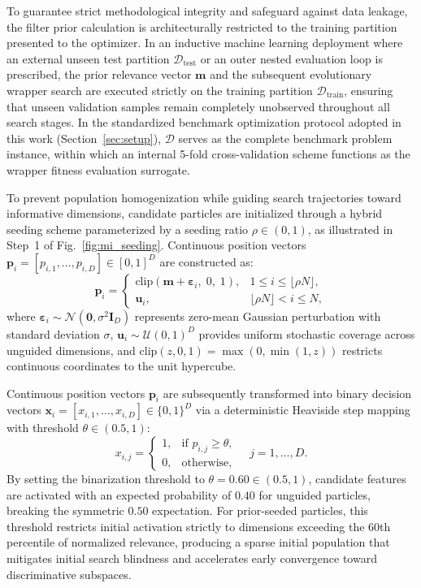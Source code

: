 To guarantee strict methodological integrity and safeguard against data leakage, the filter prior calculation is architecturally restricted to the training partition presented to the optimizer. In an inductive machine learning deployment where an external unseen test partition $\mathcal{D}_{\mathrm{test}}$ or an outer nested evaluation loop is prescribed, the prior relevance vector $\mathbf{m}$ and the subsequent evolutionary wrapper search are executed strictly on the training partition $\mathcal{D}_{\mathrm{train}}$, ensuring that unseen validation samples remain completely unobserved throughout all search stages. In the standardized benchmark optimization protocol adopted in this work (Section~\ref{sec:setup}), $\mathcal{D}$ serves as the complete benchmark problem instance, within which an internal 5-fold cross-validation scheme functions as the wrapper fitness evaluation surrogate.

To prevent population homogenization while guiding search trajectories toward informative dimensions, candidate particles are initialized through a hybrid seeding scheme parameterized by a seeding ratio $\rho \in (0, 1)$, as illustrated in Step~1 of Fig.~\ref{fig:mi_seeding}. Continuous position vectors $\mathbf{p}_i = [p_{i,1}, \dots, p_{i,D}] \in [0, 1]^D$ are constructed as:
\begin{equation}
\mathbf{p}_i = \begin{cases}
\mathrm{clip}\left(\mathbf{m} + \boldsymbol{\varepsilon}_i, \; 0, \; 1\right), & 1 \le i \le \lfloor \rho N \rfloor, \\[4pt]
\mathbf{u}_i, & \lfloor \rho N \rfloor < i \le N,
\end{cases}
\label{eq:mi_seeding}
\end{equation}
where $\boldsymbol{\varepsilon}_i \sim \mathcal{N}(\mathbf{0}, \sigma^2 \mathbf{I}_D)$ represents zero-mean Gaussian perturbation with standard deviation $\sigma$, $\mathbf{u}_i \sim \mathcal{U}(0, 1)^D$ provides uniform stochastic coverage across unguided dimensions, and $\mathrm{clip}(z, 0, 1) = \max(0, \min(1, z))$ restricts continuous coordinates to the unit hypercube.

Continuous position vectors $\mathbf{p}_i$ are subsequently transformed into binary decision vectors $\mathbf{x}_i = [x_{i,1}, \dots, x_{i,D}] \in \{0, 1\}^D$ via a deterministic Heaviside step mapping with threshold $\theta \in (0.5, 1)$:
\begin{equation}
x_{i,j} = \begin{cases}
1, & \text{if } p_{i,j} \ge \theta, \\[2pt]
0, & \text{otherwise},
\end{cases} \quad j = 1, \dots, D.
\label{eq:binarize}
\end{equation}
By setting the binarization threshold to $\theta = 0.60 \in (0.5, 1)$, candidate features are activated with an expected probability of $0.40$ for unguided particles, breaking the symmetric $0.50$ expectation. For prior-seeded particles, this threshold restricts initial activation strictly to dimensions exceeding the 60th percentile of normalized relevance, producing a sparse initial population that mitigates initial search blindness and accelerates early convergence toward discriminative subspaces.

